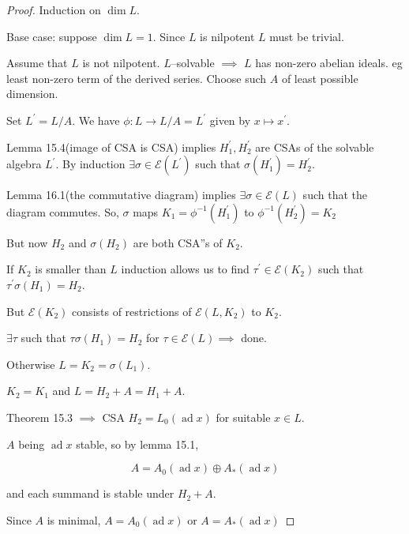 \documentclass{article}
\theoremstyle{definition}
\begin{document}
    \begin{proof}
        Induction on \(\dim L\).

        Base case: suppose \(\dim L=1\). Since \(L\) is nilpotent \(L\) must be trivial.

        Assume that \(L\) is not nilpotent. \(L\)--solvable \(\implies\) \(L\) has non-zero abelian ideals. eg least non-zero term of the derived series. Choose such \(A\) of least possible dimension.

        Set \(L^{\prime} = L / A\). We have \(\phi: L \to L / A = L^{\prime}\) given by \(x \mapsto x^{\prime}\).

        Lemma 15.4(image of CSA is CSA) implies \(H_1^{\prime} , H_2^{\prime}\) are CSAs of the solvable algebra \(L^{\prime}\). By induction \(\exists \sigma \in \mathscr{E} (L^{\prime})\) such that \(\sigma(H_1^{\prime})=H_2^{\prime}\).

        Lemma 16.1(the commutative diagram) implies \(\exists \sigma \in \mathscr{E} (L)\) such that the diagram commutes. So, \(\sigma\) maps \(K_1 = \phi ^{-1} (H_1^{\prime})\) to \(\phi ^{-1} (H_2^{\prime}) = K_2\)
        
        But now \(H_2\) and \(\sigma(H_2)\) are both CSA''s of \(K_2\).

        If \(K_2\) is smaller than \(L\) induction allows us to find \(\tau ^{\prime} \in \mathscr{E} (K_2)\) such that \(\tau ^{\prime} \sigma (H_1)=H_2\).

        But \(\mathscr{E}(K_2)\) consists of restrictions of \(\mathscr{E}(L,K_2)\) to \(K_2\).

        \(\exists \tau\) such that \(\tau \sigma (H_1) = H_2\) for \(\tau \in \mathscr{E} (L) \implies\) done.

        Otherwise \(L = K_2 = \sigma(L_1)\).

        \(K_2 = K_1\) and \(L = H_2 + A = H_1 + A\).

        Theorem 15.3 \(\implies\) CSA \(H_2 = L_0(\operatorname{ad} x)\) for suitable \(x\in L\).

        \(A\) being \(\operatorname{ad} x\) stable, so by lemma 15.1,

        \[
            A = A_0 (\operatorname{ad} x) \oplus A_{\ast} (\operatorname{ad} x)
        \]

        and each summand is stable under \(H_2 + A\).

        Since \(A\)  is minimal, \(A = A_0 (\operatorname{ad} x)\) or \(A = A_{\ast}(\operatorname{ad} x)\)  


\end{proof}
\end{document}
